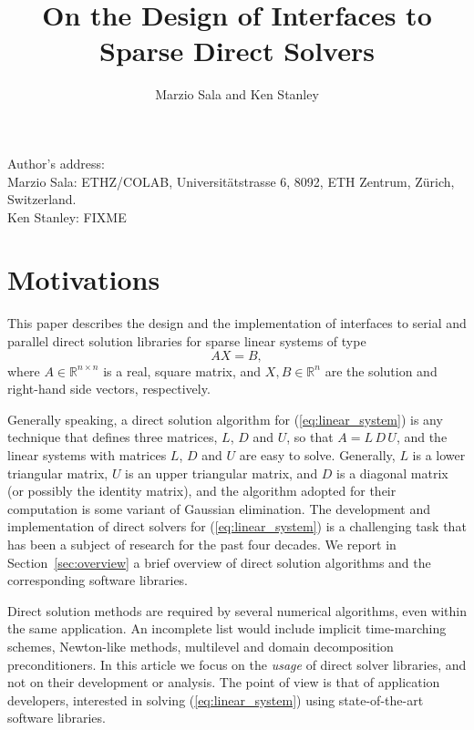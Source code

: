 \documentclass[acmtocl]{acmtrans2m}
\title{On the Design of Interfaces to Sparse Direct Solvers}
\author{Marzio Sala and Ken Stanley}
\begin{document}
\setcounter{page}{1}

\begin{bottomstuff}
Author's address:   \\
Marzio Sala: ETHZ/COLAB, Universit\"atstrasse 6, 8092, ETH Zentrum, Z\"urich,
  Switzerland. \\
Ken Stanley: FIXME
\end{bottomstuff}

\maketitle

\section{Motivations}
\label{sec:introduction}

This paper describes the design and the implementation of 
interfaces to serial and parallel direct solution libraries for
sparse linear systems of type
\begin{equation}
  \label{eq:linear_system}
  A X = B,
\end{equation}
where $A \in \mathbb{R}^{n \times n}$ is a real, square matrix, 
  and $X, B \in \mathbb{R}^{n}$ are the solution and
right-hand side vectors, respectively. 

Generally speaking,
a direct solution algorithm for (\ref{eq:linear_system}) is any 
technique that defines three matrices, $L$, $D$ and $U$, so that
$A = L \, D \, U$, and the linear systems with matrices $L$, $D$ and $U$ are
easy to solve. Generally, $L$ is a lower triangular matrix, $U$ is an
upper triangular matrix, and $D$ is a diagonal matrix 
(or possibly the identity matrix), and the algorithm adopted for their
computation is some variant of Gaussian elimination. 
The development and implementation of
direct solvers for (\ref{eq:linear_system}) is a
challenging task that has been a subject of research for the
past four decades. 
We report in
Section~\ref{sec:overview} a brief overview of direct solution algorithms and
the corresponding software libraries.

\smallskip

Direct solution methods are required by several numerical algorithms, even
within the same application. An
incomplete list would include implicit time-marching schemes, 
Newton-like methods, multilevel and domain decomposition preconditioners. In
this article we focus on the {\sl usage} of direct solver libraries, and not
on their development or analysis. The point of view is that
of application developers, interested in solving
(\ref{eq:linear_system}) using state-of-the-art software libraries.  
\end{document}
